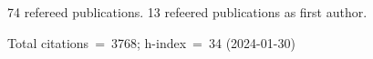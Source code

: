74 refereed publications. 13 refeered publications as first author.

Total citations~=~3768; h-index~=~34 (2024-01-30)